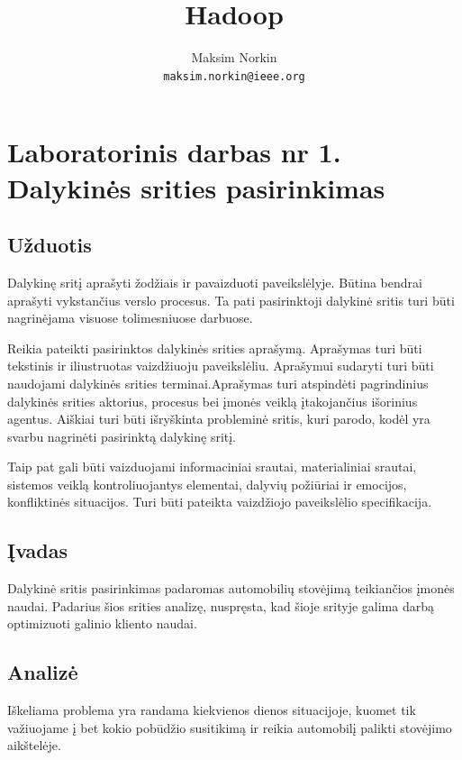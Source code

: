 \documentclass[10pt]{IEEEtran}
\author{Maksim Norkin\\ \texttt{maksim.norkin@ieee.org}}
\title{Hadoop}
\begin{document}
    \maketitle

    \section{Laboratorinis darbas nr 1. Dalykinės srities pasirinkimas}

        \subsection{Užduotis}

            Dalykinę sritį aprašyti žodžiais ir pavaizduoti paveikslėlyje. Būtina bendrai aprašyti vykstančius verslo procesus. Ta pati pasirinktoji dalykinė sritis turi būti nagrinėjama visuose  tolimesniuose darbuose. 

            Reikia pateikti pasirinktos dalykinės srities aprašymą. Aprašymas turi būti tekstinis ir  iliustruotas vaizdžiuoju paveikslėliu. Aprašymui sudaryti turi būti naudojami dalykinės srities  terminai.Aprašymas turi atspindėti pagrindinius dalykinės srities aktorius, procesus bei įmonės veiklą įtakojančius išorinius agentus. Aiškiai turi būti išryškinta probleminė sritis, kuri parodo, kodėl yra svarbu nagrinėti pasirinktą dalykinę sritį. 

            Taip pat gali būti vaizduojami informaciniai srautai, materialiniai srautai, sistemos veiklą  kontroliuojantys elementai, dalyvių požiūriai ir emocijos, konfliktinės situacijos. Turi būti pateikta vaizdžiojo paveikslėlio specifikacija.

        \subsection{Įvadas}

            Dalykinė sritis pasirinkimas padaromas automobilių stovėjimą teikiančios įmonės naudai. Padarius šios srities analizę, nuspręsta, kad šioje srityje galima darbą optimizuoti galinio kliento naudai.

        \subsection{Analizė}

            Iškeliama problema yra randama kiekvienos dienos situacijoje, kuomet tik važiuojame į bet kokio pobūdžio susitikimą ir reikia automobilį palikti stovėjimo aikštelėje.
\end{document}
